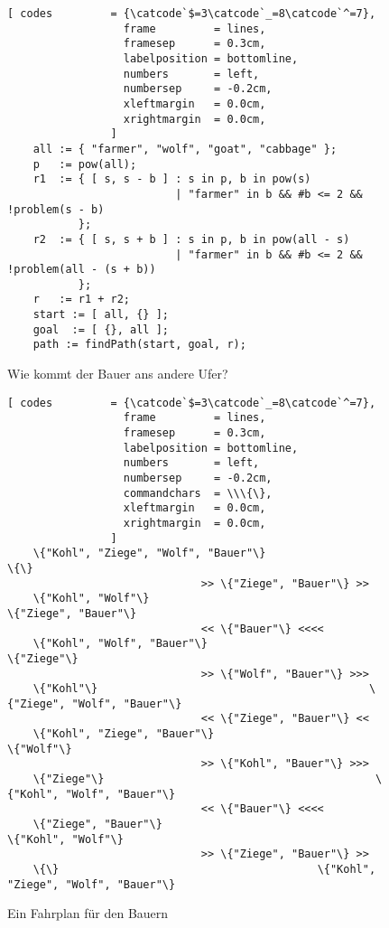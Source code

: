 \begin{figure}[!ht]
  \centering
\begin{Verbatim}[ codes         = {\catcode`$=3\catcode`_=8\catcode`^=7},
                  frame         = lines, 
                  framesep      = 0.3cm, 
                  labelposition = bottomline,
                  numbers       = left,
                  numbersep     = -0.2cm,
                  xleftmargin   = 0.0cm,
                  xrightmargin  = 0.0cm,
                ]
    all := { "farmer", "wolf", "goat", "cabbage" };
    p   := pow(all);
    r1  := { [ s, s - b ] : s in p, b in pow(s) 
                          | "farmer" in b && #b <= 2 && !problem(s - b) 
           };
    r2  := { [ s, s + b ] : s in p, b in pow(all - s) 
                          | "farmer" in b && #b <= 2 && !problem(all - (s + b))
           };
    r   := r1 + r2;
    start := [ all, {} ];
    goal  := [ {}, all ];
    path := findPath(start, goal, r);
\end{Verbatim} 
\vspace*{-0.3cm}
\caption{Wie kommt der Bauer ans andere Ufer?}  
\label{fig:wolf-ziege}
\end{figure} %
\noindent

\begin{figure}[!ht]
  \centering
\begin{Verbatim}[ codes         = {\catcode`$=3\catcode`_=8\catcode`^=7},
                  frame         = lines, 
                  framesep      = 0.3cm, 
                  labelposition = bottomline,
                  numbers       = left,
                  numbersep     = -0.2cm,
                  commandchars  = \\\{\},
                  xleftmargin   = 0.0cm,
                  xrightmargin  = 0.0cm,
                ]
    \{"Kohl", "Ziege", "Wolf", "Bauer"\}                                        \{\}
                              >> \{"Ziege", "Bauer"\} >>
    \{"Kohl", "Wolf"\}                                          \{"Ziege", "Bauer"\}
                              << \{"Bauer"\} <<<< 
    \{"Kohl", "Wolf", "Bauer"\}                                          \{"Ziege"\}
                              >> \{"Wolf", "Bauer"\} >>>
    \{"Kohl"\}                                          \{"Ziege", "Wolf", "Bauer"\}
                              << \{"Ziege", "Bauer"\} <<
    \{"Kohl", "Ziege", "Bauer"\}                                          \{"Wolf"\}
                              >> \{"Kohl", "Bauer"\} >>>
    \{"Ziege"\}                                          \{"Kohl", "Wolf", "Bauer"\}
                              << \{"Bauer"\} <<<< 
    \{"Ziege", "Bauer"\}                                          \{"Kohl", "Wolf"\}
                              >> \{"Ziege", "Bauer"\} >>    
    \{\}                                        \{"Kohl", "Ziege", "Wolf", "Bauer"\}
\end{Verbatim} 
\vspace*{-0.3cm}
\caption{Ein Fahrplan f\"{u}r den Bauern}  
\label{fig:wolf-ziege-solution}
\end{figure} %


